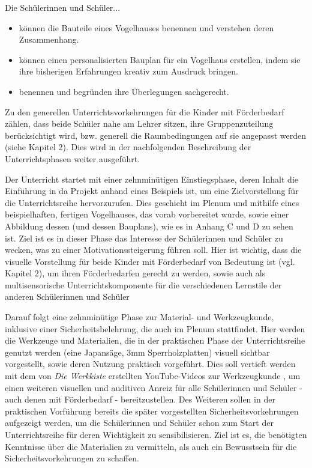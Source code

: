 \documentclass[12pt]{article}
\begin{document}
Die Schülerinnen und Schüler...
\begin{itemize}
    \item können die Bauteile eines Vogelhauses benennen und verstehen deren Zusammenhang.
    \item können einen personalisierten Bauplan für ein Vogelhaus erstellen, indem sie ihre bisherigen Erfahrungen kreativ zum Ausdruck bringen.
    \item benennen und begründen ihre Überlegungen sachgerecht.
\end{itemize}

Zu den generellen Unterrichtsvorkehrungen für die Kinder mit Förderbedarf zählen, dass beide Schüler nahe am Lehrer sitzen, ihre Gruppenzuteilung berücksichtigt wird, bzw. generell die Raumbedingungen auf sie angepasst werden (siehe Kapitel 2). Dies wird in der nachfolgenden Beschreibung der Unterrichtsphasen weiter ausgeführt.

Der Unterricht startet mit einer zehnminütigen Einstiegsphase, deren Inhalt die Einführung in da Projekt anhand eines Beispiels ist, um eine Zielvorstellung für die Unterrichtsreihe hervorzurufen. Dies geschieht im Plenum und mithilfe eines beispielhaften, fertigen Vogelhauses, das vorab vorbereitet wurde, sowie einer Abbildung dessen (und dessen Bauplans), wie es in Anhang C und D zu sehen ist. Ziel ist es in dieser Phase das Interesse der Schülerinnen und Schüler zu wecken, was zu einer Motivationssteigerung führen soll. Hier ist wichtig, dass die visuelle Vorstellung für beide Kinder mit Förderbedarf von Bedeutung ist (vgl. Kapitel 2), um ihren Förderbedarfen gerecht zu werden, sowie auch als multisensorische Unterrichtskomponente für die verschiedenen Lernstile der anderen Schülerinnen und Schüler 

Darauf folgt eine zehnminütige Phase zur Material- und Werkzeugkunde, inklusive einer Sicherheitsbelehrung, die auch im Plenum stattfindet. Hier werden die Werkzeuge und Materialien, die in der praktischen Phase der Unterrichtsreihe genutzt werden (eine Japansäge, 3mm Sperrholzplatten) visuell sichtbar vorgestellt, sowie deren Nutzung praktisch vorgeführt. Dies soll vertieft werden mit dem von \textit{Die Werkkiste} erstellten YouTube-Videos zur Werkzeugkunde \Autocite{die_werkkiste_werkzeugfuhrerschein_2018}, um einen weiteren visuellen und auditiven Anreiz für alle Schülerinnen und Schüler - auch denen mit Förderbedarf - bereitzustellen. Des Weiteren sollen in der praktischen Vorführung bereits die später vorgestellten Sicherheitsvorkehrungen aufgezeigt werden, um die Schülerinnen und Schüler schon zum Start der Unterrichtsreihe für deren Wichtigkeit zu sensibilisieren. Ziel ist es, die benötigten Kenntnisse über die Materialien zu vermitteln, als auch ein Bewusstsein für die Sicherheitsvorkehrungen zu schaffen. 
\end{document}

